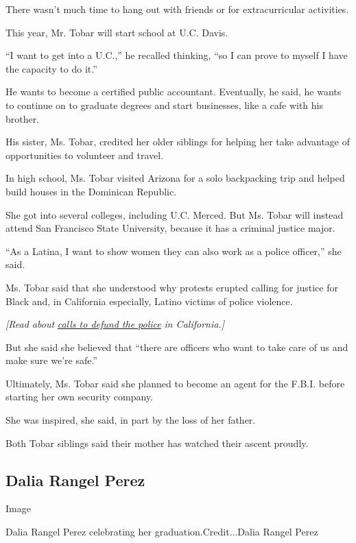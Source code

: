 There wasn't much time to hang out with friends or for extracurricular
activities.

This year, Mr. Tobar will start school at U.C. Davis.

``I want to get into a U.C.,'' he recalled thinking, ``so I can prove to
myself I have the capacity to do it.''

He wants to become a certified public accountant. Eventually, he said,
he wants to continue on to graduate degrees and start businesses, like a
cafe with his brother.

His sister, Ms. Tobar, credited her older siblings for helping her take
advantage of opportunities to volunteer and travel.

In high school, Ms. Tobar visited Arizona for a solo backpacking trip
and helped build houses in the Dominican Republic.

She got into several colleges, including U.C. Merced. But Ms. Tobar will
instead attend San Francisco State University, because it has a criminal
justice major.

``As a Latina, I want to show women they can also work as a police
officer,'' she said.

Ms. Tobar said that she understood why protests erupted calling for
justice for Black and, in California especially, Latino victims of
police violence.

\emph{{[}Read about}
\href{https://www.nytimes3xbfgragh.onion/2020/06/09/us/ca-defund-police.html}{\emph{calls
to defund the police}} \emph{in California.{]}}

But she said she believed that ``there are officers who want to take
care of us and make sure we're safe.''

Ultimately, Ms. Tobar said she planned to become an agent for the F.B.I.
before starting her own security company.

She was inspired, she said, in part by the loss of her father.

Both Tobar siblings said their mother has watched their ascent proudly.

\hypertarget{dalia-rangel-perez}{%
\subsection{Dalia Rangel Perez}\label{dalia-rangel-perez}}

Image

Dalia Rangel Perez celebrating her graduation.Credit...Dalia Rangel
Perez

